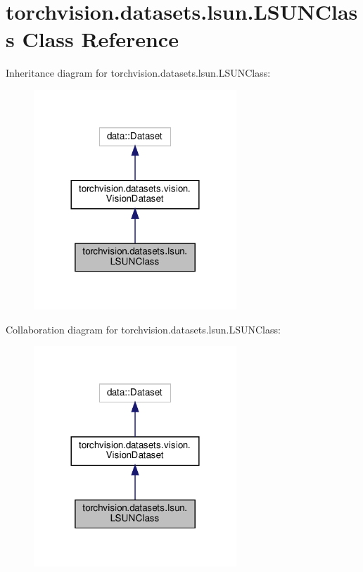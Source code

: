 \hypertarget{classtorchvision_1_1datasets_1_1lsun_1_1LSUNClass}{}\section{torchvision.\+datasets.\+lsun.\+L\+S\+U\+N\+Class Class Reference}
\label{classtorchvision_1_1datasets_1_1lsun_1_1LSUNClass}


Inheritance diagram for torchvision.\+datasets.\+lsun.\+L\+S\+U\+N\+Class\+:
\nopagebreak
\begin{figure}[H]
\begin{center}
\leavevmode
\includegraphics[width=216pt]{classtorchvision_1_1datasets_1_1lsun_1_1LSUNClass__inherit__graph}
\end{center}
\end{figure}


Collaboration diagram for torchvision.\+datasets.\+lsun.\+L\+S\+U\+N\+Class\+:
\nopagebreak
\begin{figure}[H]
\begin{center}
\leavevmode
\includegraphics[width=216pt]{classtorchvision_1_1datasets_1_1lsun_1_1LSUNClass__coll__graph}
\end{center}
\end{figure}
